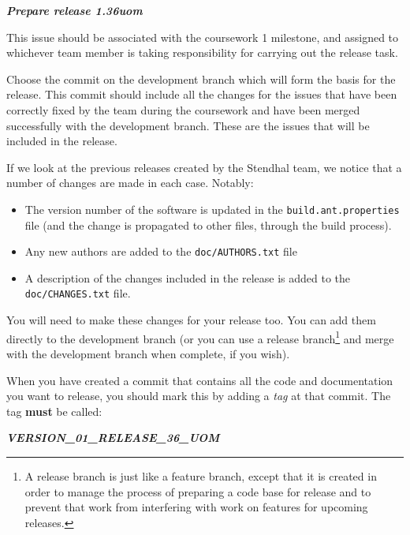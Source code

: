 \documentclass[
]{book}
\newenvironment{Shaded}{\begin{snugshade}}{\end{snugshade}}
\newcommand{\InformationTok}[1]{\textcolor[rgb]{0.56,0.35,0.01}{\textbf{\textit{#1}}}}
\providecommand{\tightlist}{%
  \setlength{\itemsep}{0pt}\setlength{\parskip}{0pt}}
\begin{document}
\begin{Shaded}
\begin{Highlighting}[]
\InformationTok{    Prepare release 1.36uom}
\end{Highlighting}
\end{Shaded}

This issue should be associated with the coursework 1 milestone, and assigned to whichever team member is taking responsibility for carrying out the release task.

Choose the commit on the development branch which will form the basis for the release. This commit should include all the changes for the issues that have been correctly fixed by the team during the coursework and have been merged successfully with the development branch. These are the issues that will be included in the release.

If we look at the previous releases created by the Stendhal team, we notice that a number of changes are made in each case. Notably:

\begin{itemize}
\tightlist
\item
  The version number of the software is updated in the \texttt{build.ant.properties} file (and the change is propagated to other files, through the build process).
\item
  Any new authors are added to the \texttt{doc/AUTHORS.txt} file
\item
  A description of the changes included in the release is added to the \texttt{doc/CHANGES.txt} file.
\end{itemize}

You will need to make these changes for your release too. You can add them directly to the development branch (or you can use a release branch\footnote{A release branch is just like a feature branch, except that it is created in order to manage the process of preparing a code base for release and to prevent that work from interfering with work on features for upcoming releases.} and merge with the development branch when complete, if you wish).

When you have created a commit that contains all the code and documentation you want to release, you should mark this by adding a \emph{tag} at that commit. The tag \textbf{must} be called:

\begin{Shaded}
\begin{Highlighting}[]
\InformationTok{    VERSION\_01\_RELEASE\_36\_UOM}
\end{Highlighting}
\end{Shaded}
\end{document}

